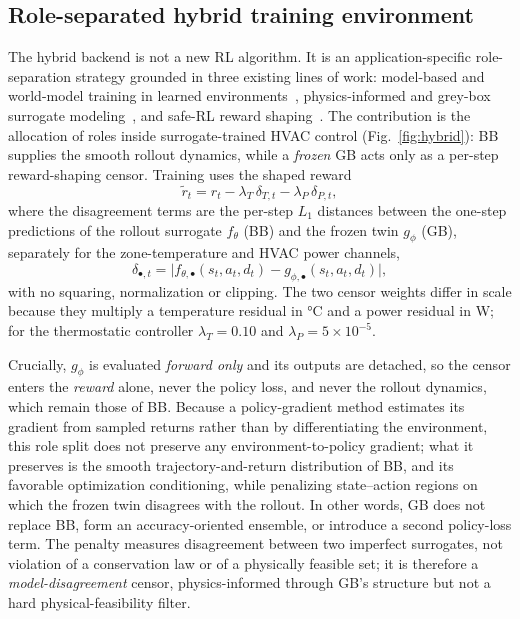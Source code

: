 \documentclass{ieeeaccess}
\begin{document}
\subsection{Role-separated hybrid training environment}\label{ssec:hybrid}
The hybrid backend is not a new RL algorithm. It is an application-specific role-separation strategy
grounded in three existing lines of work: model-based and world-model training in learned
environments~\cite{Sutton1991Dyna,Hafner2025Dreamer}, physics-informed and grey-box surrogate
modeling~\cite{Bacher2011RCIdentification,Raissi2019PINN,Willard2022PIML}, and safe-RL reward
shaping~\cite{Garcia2015SafeRL,Wang2025SafeDRL}. The contribution is the allocation of roles inside
surrogate-trained HVAC control (Fig.~\ref{fig:hybrid}): BB supplies the smooth rollout dynamics,
while a \emph{frozen} GB acts only as a per-step reward-shaping censor. Training uses the shaped
reward
\begin{equation}
\tilde{r}_t=r_t-\lambda_T\,\delta_{T,t}-\lambda_P\,\delta_{P,t},
\label{eq:hybrid}
\end{equation}
where the disagreement terms are the per-step $L_1$ distances between the one-step predictions of
the rollout surrogate $f_\theta$ (BB) and the frozen twin $g_\phi$ (GB), separately for the
zone-temperature and HVAC power channels,
\begin{equation*}
\delta_{\bullet,t}=\big|f_{\theta,\bullet}(s_t,a_t,d_t)-g_{\phi,\bullet}(s_t,a_t,d_t)\big|,
\end{equation*}
with no squaring, normalization or clipping. The two censor weights differ in scale because they
multiply a temperature residual in \si{\celsius} and a power residual in \si{\watt}; for the
thermostatic controller $\lambda_T=0.10$ and $\lambda_P=5\times10^{-5}$.

Crucially, $g_\phi$ is evaluated \emph{forward only} and its outputs are detached, so the censor
enters the \emph{reward} alone, never the policy loss, and never the rollout dynamics, which remain
those of BB. Because a policy-gradient method estimates its gradient from sampled returns rather
than by differentiating the environment, this role split does not preserve any
environment-to-policy gradient; what it preserves is the smooth trajectory-and-return distribution
of BB, and its favorable optimization conditioning, while penalizing state--action regions on which
the frozen twin disagrees with the rollout. In other words, GB does not replace BB, form an
accuracy-oriented ensemble, or introduce a second policy-loss term. The penalty measures
disagreement between two imperfect surrogates, not violation of a conservation law or of a
physically feasible set; it is therefore a \emph{model-disagreement} censor, physics-informed
through GB's structure but not a hard physical-feasibility filter.
\end{document}
